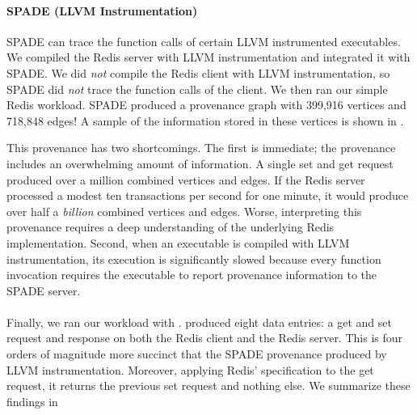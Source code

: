 \paragraph{SPADE (LLVM Instrumentation)}
SPADE can trace the function calls of certain LLVM instrumented executables. We
compiled the Redis server with LLVM instrumentation and integrated it with
SPADE. We did \emph{not} compile the Redis client with LLVM instrumentation, so
SPADE did \emph{not} trace the function calls of the client. We then ran our
simple Redis workload. SPADE produced a provenance graph with 399,916 vertices
and 718,848 edges! A sample of the information stored in these vertices is
shown in .

This provenance has two shortcomings. The first is immediate; the provenance
includes an overwhelming amount of information. A single set and get request
produced over a million combined vertices and edges. If the Redis server
processed a modest ten transactions per second for one minute, it would produce
over half a \emph{billion} combined vertices and edges. Worse, interpreting
this provenance requires a deep understanding of the underlying Redis
implementation. Second, when an executable is compiled with LLVM
instrumentation, its execution is significantly slowed because every function
invocation requires the executable to report provenance information to the
SPADE server.

\paragraph{\fluent{}}
Finally, we ran our workload with \fluent{}. \fluent{} produced eight data
entries: a get and set request and response on both the Redis client and the
Redis server. This is four orders of magnitude more succinct that the SPADE
provenance produced by LLVM instrumentation. Moreover, applying Redis'
\watprovenance{} specification to the get request, it returns the previous set
request and nothing else. We summarize these findings in 

